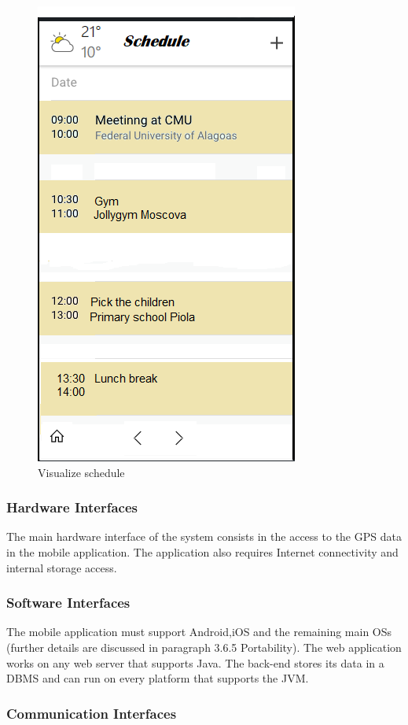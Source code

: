 		\begin{figure}[H]
			\centerline{\includegraphics[scale=0.5]{Images/schedule}}
			\caption{Visualize schedule}
		\end{figure}
	
	\subsubsection{Hardware Interfaces}
	The main hardware interface of the system consists in the access to the GPS data
	in the mobile application. The application also requires Internet connectivity
	and internal storage access.
	
	\subsubsection{Software Interfaces}
	The mobile application must support Android,iOS and the remaining main OSs (further details are discussed in paragraph 3.6.5 Portability). The web application
	works on any web server that supports Java. The back-end stores its data in a
	DBMS and can run on every platform that supports the JVM.
	\subsubsection{Communication Interfaces}
